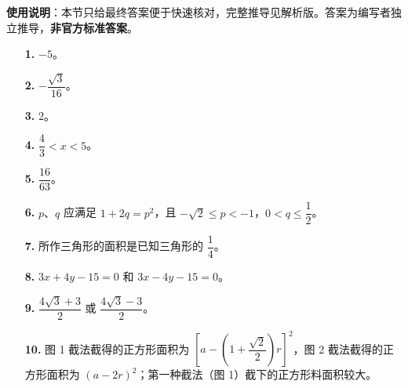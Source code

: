 
\begin{gknotice}
\textbf{使用说明}：本节只给最终答案便于快速核对，完整推导见解析版。答案为编写者独立推导，\textbf{非官方标准答案}。
\end{gknotice}

\begin{itemize}[leftmargin=2.6em]
  \item[\textbf{1.}] $-5$。
  \item[\textbf{2.}] $-\dfrac{\sqrt3}{16}$。
  \item[\textbf{3.}] $2$。
  \item[\textbf{4.}] $\dfrac43<x<5$。
  \item[\textbf{5.}] $\dfrac{16}{63}$。
  \item[\textbf{6.}] $p\text{、}q$ 应满足 $1+2q=p^2$，且 $-\sqrt2\leqslant p<-1$，$0<q\leqslant\dfrac12$。
  \item[\textbf{7.}] 所作三角形的面积是已知三角形的 $\dfrac14$。
  \item[\textbf{8.}] $3x+4y-15=0$ 和 $3x-4y-15=0$。
  \item[\textbf{9.}] $\dfrac{4\sqrt3+3}{2}$ 或 $\dfrac{4\sqrt3-3}{2}$。
  \item[\textbf{10.}] 图 1 截法截得的正方形面积为 $\left[a-\left(1+\dfrac{\sqrt2}{2}\right)r\right]^2$，图 2 截法截得的正方形面积为 $(a-2r)^2$；第一种截法（图 1）截下的正方形料面积较大。
\end{itemize}
